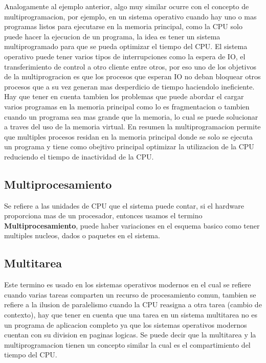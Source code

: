\documentclass[conference,letterpaper]{IEEEtran}
\begin{document}
Analogamente al ejemplo anterior, algo muy similar ocurre con el concepto de multiprogramacion, por ejemplo, en un sistema operativo cuando hay uno o mas programas listos para ejecutarse en la memoria principal, como la CPU solo puede hacer la ejecucion de un programa, la idea es tener un sistema multiprogramado para que se pueda optimizar el tiempo del CPU. El sistema operativo puede tener varios tipos de interrupciones como la espera de IO, el transferimiento de control a otro cliente entre otros, por eso uno de los objetivos de la multiprogracion es que los procesos que esperan IO no deban bloquear otros procesos que a su vez generan mas desperdicio de tiempo haciendolo ineficiente.\\

Hay que tener en cuenta tambien los problemas que puede abordar el cargar varios programas en la memoria principal como lo es fragmentacion o tambien cuando un programa sea mas grande que la memoria, lo cual se puede solucionar a traves del uso de la memoria virtual. En resumen la multiprogramacion permite que multiples procesos residan en la memoria principal donde se solo se ejecuta un programa y tiene como obejtivo principal optimizar la utilizacion  de la CPU reduciendo el tiempo de inactividad de la CPU.\\

\subsection{Multiprocesamiento}
Se refiere a las unidades de CPU que el sistema puede contar, si el hardware proporciona mas de un procesador, entonces usamos el termino \textbf{Multiprocesamiento}, puede haber variaciones en el esquema basico como tener multiples nucleos, dados o paquetes en el sistema.

\subsection{Multitarea}
Este termino es usado en los sistemas operativos modernos en el cual se refiere cuando varias tareas comparten un recurso de procesamiento comun, tambien se refiere a la ilusion de paralelismo cuando la CPU reasigna a otra tarea (cambio de contexto), hay que tener en cuenta que una tarea en un sistema multitarea no es un programa de aplicacion completo ya que los sistemas operativos modernos cuentan con su division en paginas logicas. Se puede decir que la multitarea y la multiprogramacion tienen un concepto similar la cual es el compartimiento del tiempo del CPU.
\end{document}
